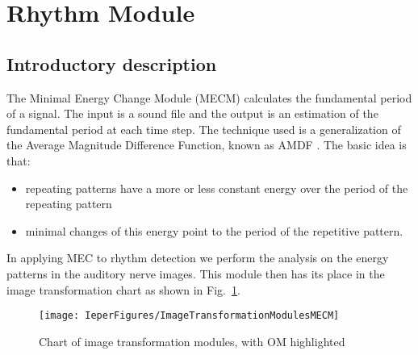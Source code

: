 \newpage
\section{Rhythm Module}

\hypertarget{Concepts:MinimalEnergyChangeModule}{}

\hypertarget{Concepts:IPEMMECAnalysis}{}
\hypertarget{Concepts:IPEMMECExtractPatterns}{}
\hypertarget{Concepts:IPEMMECReSynthUI}{}
\hypertarget{Concepts:IPEMMECSynthesis}{}
\hypertarget{Concepts:IPEMMECSaveResults}{}

\subsection*{Introductory description}

The Minimal Energy Change Module (MECM) calculates the
fundamental period of a signal. The input is a sound file and the
output is an estimation of the fundamental period at each time
step. The technique used is a generalization of the Average
Magnitude Difference Function, known as AMDF
\citeyear{article:LemanVerbeke:Ieper:2000}. The basic idea is
that:
\begin{itemize}
\item
repeating patterns have a more or less constant energy over the
period of the repeating pattern
\item
minimal changes of this energy point to the period of the
repetitive pattern.
\end{itemize}
In applying MEC to rhythm detection we perform the analysis on
the energy patterns in the auditory nerve images. This module
then has its place in the image transformation chart as shown in
Fig.~\ref{ImageTransformationModulesMECM}.
\begin{figure}[h]
  \centering
\texttt{[image: IeperFigures/ImageTransformationModulesMECM]}
  \caption{Chart of image transformation modules, with OM highlighted}
  \label{ImageTransformationModulesMECM}
\end{figure}


